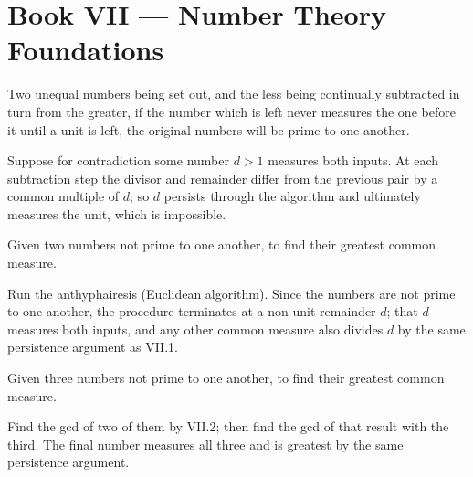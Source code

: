 %
%

\section{Book VII --- Number Theory Foundations}
\label{sec:book-VII}

\begin{claim}
\label{prop:VII.1}
Two unequal numbers being set out, and the less being continually
subtracted in turn from the greater, if the number which is left
never measures the one before it until a unit is left, the original
numbers will be prime to one another.
\end{claim}
\begin{evidence}
\label{ev:VII.1}
Suppose for contradiction some number $d > 1$ measures both inputs.
At each subtraction step the divisor and remainder differ from the
previous pair by a common multiple of $d$; so $d$ persists through
the algorithm and ultimately measures the unit, which is impossible.
\end{evidence}

\begin{claim}
\label{prop:VII.2}
Given two numbers not prime to one another, to find their greatest
common measure.
\end{claim}
\begin{evidence}
\label{ev:VII.2}
Run the anthyphairesis (Euclidean algorithm).  Since the numbers are
not prime to one another, the procedure terminates at a non-unit
remainder $d$; that $d$ measures both inputs, and any other common
measure also divides $d$ by the same persistence argument as VII.1.
\end{evidence}

\begin{claim}
\label{prop:VII.3}
Given three numbers not prime to one another, to find their greatest
common measure.
\end{claim}
\begin{evidence}
\label{ev:VII.3}
Find the gcd of two of them by VII.2; then find the gcd of that
result with the third.  The final number measures all three and is
greatest by the same persistence argument.
\end{evidence}


